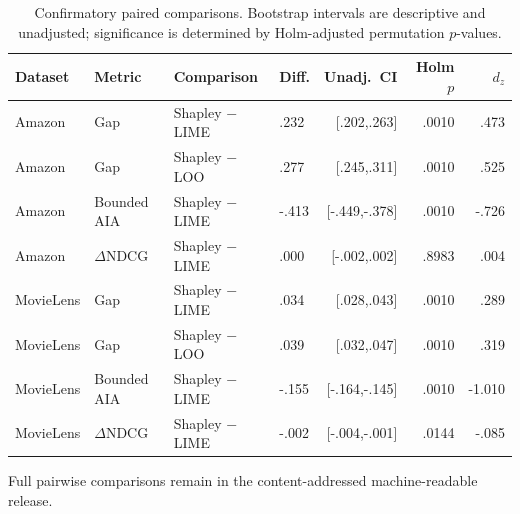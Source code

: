 \begin{table}[!htbp]
\centering\scriptsize
\caption{Confirmatory paired comparisons. Bootstrap intervals are descriptive and unadjusted; significance is determined by Holm-adjusted permutation $p$-values.}
\label{tab:app-statistics}
\setlength{\tabcolsep}{2.5pt}
\begin{tabular}{@{}ll>{\raggedright\arraybackslash}p{}>{\raggedright\arraybackslash}p{}rrr@{}}
\toprule
Dataset & Metric & Comparison & Diff. & Unadj.\ CI & Holm $p$ & $d_z$ \\
\midrule
Amazon & Gap & Shapley $-$ LIME & .232 & [.202,.263] & .0010 & .473 \\
Amazon & Gap & Shapley $-$ LOO & .277 & [.245,.311] & .0010 & .525 \\
Amazon & Bounded AIA & Shapley $-$ LIME & -.413 & [-.449,-.378] & .0010 & -.726 \\
Amazon & $\Delta$NDCG & Shapley $-$ LIME & .000 & [-.002,.002] & .8983 & .004 \\
MovieLens & Gap & Shapley $-$ LIME & .034 & [.028,.043] & .0010 & .289 \\
MovieLens & Gap & Shapley $-$ LOO & .039 & [.032,.047] & .0010 & .319 \\
MovieLens & Bounded AIA & Shapley $-$ LIME & -.155 & [-.164,-.145] & .0010 & -1.010 \\
MovieLens & $\Delta$NDCG & Shapley $-$ LIME & -.002 & [-.004,-.001] & .0144 & -.085 \\
\bottomrule
\end{tabular}
\end{table}

\noindent Full pairwise comparisons remain in the content-addressed machine-readable release.
